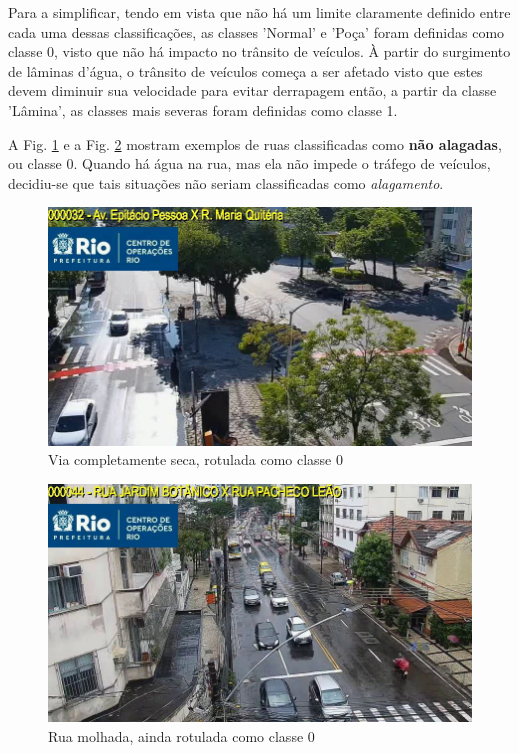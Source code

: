 
Para a simplificar, tendo em vista que não há um limite claramente definido entre cada uma dessas classificações, as classes 'Normal' e 'Poça' foram definidas como classe 0, 
visto que não há impacto no trânsito de veículos. À partir do surgimento de lâminas d'água, 
o trânsito de veículos começa a ser afetado visto que estes devem diminuir sua velocidade para evitar derrapagem \cite{michelinaquaplaning} então, a partir da classe 'Lâmina', 
as classes mais severas foram definidas como classe 1.

A Fig. \ref{fig:class0_1} e a Fig. \ref{fig:class0_2} mostram exemplos de ruas classificadas como \textbf{não alagadas}, ou classe 0. Quando há água na rua, mas ela não impede o tráfego de veículos, decidiu-se que tais situações não seriam classificadas como \textit{alagamento}.

\begin{figure}[htb]
\centerline{\includegraphics[width=0.8\linewidth]{images/0/CODE32 2023-02-22 08-15-04-6.jpg}}
\caption{Via completamente seca, rotulada como classe 0}
\label{fig:class0_1}
\end{figure}

\begin{figure}[htb]
\centerline{\includegraphics[width=0.8\linewidth]{images/0/CODE44 2023-08-20 13-30-31-6.jpg}}
\caption{Rua molhada, ainda rotulada como classe 0}
\label{fig:class0_2}
\end{figure}

